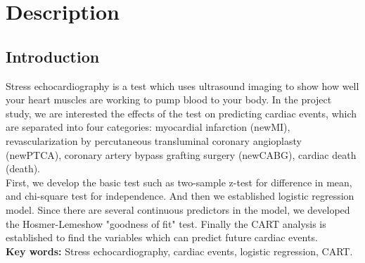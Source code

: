 \documentclass[a4paper,12pt]{article}
\begin{document}
\onehalfspacing
\section{Description}
  \subsection{Introduction}
   	 Stress echocardiography is a test which uses ultrasound imaging to show how well your heart muscles are working to pump blood to your body. In the project study, we are interested the effects of the test on predicting cardiac events, which are separated into four categories: myocardial infarction (newMI), revascularization by percutaneous transluminal coronary angioplasty (newPTCA), coronary artery bypass grafting surgery (newCABG), cardiac death (death).\\


	First, we develop the basic test such as two-sample z-test for difference in mean, and chi-square test for independence. And then we established logistic regression model. Since there are several continuous predictors in the model, we developed the Hosmer-Lemeshow "goodness of fit" test. Finally the CART analysis is established to find the variables which can predict future cardiac events.\\
\textbf{Key words:}	  Stress echocardiography, cardiac events, logistic regression, CART.
\end{document}
